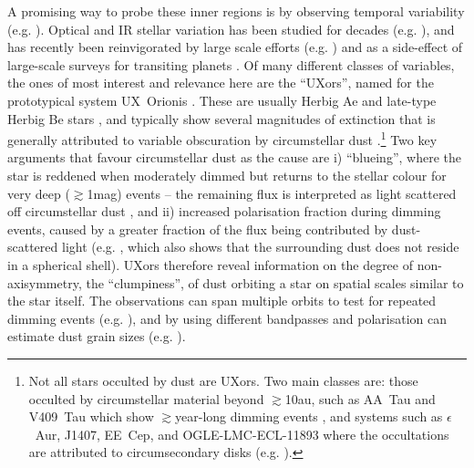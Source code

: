 \documentclass[]{rsos}
\begin{document}
A promising way to probe these inner regions is by observing temporal variability
(e.g. \cite{2014Sci...345.1032M}). Optical and IR stellar variation has been studied for
decades (e.g. \cite{1945ApJ...102..168J,1994AJ....108.1906H}), and has recently been
reinvigorated by large scale efforts
(e.g. \cite{2011ApJ...733...50M,2014AJ....147...82C}) and as a side-effect of large-scale
surveys for transiting planets \cite{2012AJ....143...72M,2013AJ....146..112R}. Of many
different classes of variables, the ones of most interest and relevance here are the
``UXors'', named for the prototypical system UX~Orionis \cite{1994AJ....108.1906H}. These
are usually Herbig Ae and late-type Herbig Be stars \cite{1984A&AS...55..109F}, and
typically show several magnitudes of extinction that is generally attributed to variable
obscuration by circumstellar dust
\cite{1994AJ....108.1906H,1999AJ....118.1043H,2000A&A...364..633N}.\footnote{Not all
  stars occulted by dust are UXors. Two main classes are: those occulted by circumstellar
  material beyond $\gtrsim$10au, such as AA~Tau and V409~Tau which show
  $\gtrsim$year-long dimming events \cite{2013A&A...557A..77B,2015AJ....150...32R}, and
  systems such as $\epsilon$~Aur, J1407, EE~Cep, and OGLE-LMC-ECL-11893 where the
  occultations are attributed to circumsecondary disks
  (e.g. \cite{1999MNRAS.303..521M,2012AJ....143...72M,2014ApJ...788...41D,2015ApJS..220...14K}).}
Two key arguments that favour circumstellar dust as the cause are i) ``blueing'', where
the star is reddened when moderately dimmed but returns to the stellar colour for very
deep ($\gtrsim$1mag) events -- the remaining flux is interpreted as light scattered off
circumstellar dust \cite{1988SvAL...14...27G}, and ii) increased polarisation fraction
during dimming events, caused by a greater fraction of the flux being contributed by
dust-scattered light (e.g. \cite{2001ARep...45...51R}, which also shows that the
surrounding dust does not reside in a spherical shell). UXors therefore reveal
information on the degree of non-axisymmetry, the ``clumpiness'', of dust orbiting a star
on spatial scales similar to the star itself. The observations can span multiple orbits
to test for repeated dimming events (e.g. \cite{1999A&A...349..619B}), and by using
different bandpasses and polarisation can estimate dust grain sizes
(e.g. \cite{1988SvAL...14...27G,1994ASPC...62...63G}).
\end{document}
